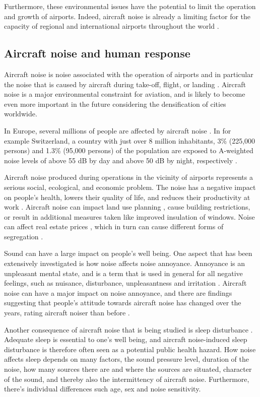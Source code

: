 Furthermore, these environmental issues have the potential to limit the
operation and growth of airports. Indeed, aircraft noise is already a limiting
factor for the capacity of regional and international airports throughout the
world \cite{Zaporozhets2011}.

\subsection{Aircraft noise and human response}
Aircraft noise is noise associated with the operation of airports and in
particular the noise that is caused by aircraft during take-off, flight, or
landing \cite{Zaporozhets2011}. Aircraft noise is a major environmental
constraint for aviation, and is likely to become even more important in the
future considering the densification of cities worldwide.

In Europe, several millions of people are affected by aircraft noise
\cite{MPDGroupLimited2007}. In for example Switzerland, a country with just over
8 million inhabitants, 3\% (225,000 persons) and 1.3\% (95,000 persons) of the
population are exposed to A-weighted noise levels of above 55 dB by day and above
50 dB by night, respectively \cite{Kirk2009,Schaffer2014}.

Aircraft noise produced during operations in the vicinity of airports represents
a serious social, ecological, and economic problem. The noise has a negative
impact on people's health, lowers their quality of life, and reduces their
productivity at work \cite{Zaporozhets2011}. Aircraft noise can impact land use
planning \cite{Freestone2010}, cause building restrictions, or result
in additional measures taken like improved insulation of windows. Noise can
affect real estate prices \cite{Theebe2004}, which in turn can cause different
forms of segregation \cite{Bjornskau2005}.

Sound can have a large impact on people's well being. One aspect that has been
extensively investigated is how noise affects noise annoyance. Annoyance is an
unpleasant mental state, and is a term that is used in general for all negative
feelings, such as nuisance, disturbance, unpleasantness and irritation
\cite{Guski1999}. Aircraft noise can have a major impact on noise annoyance,
and there are findings suggesting that people's attitude towards aircraft noise
has changed over the years, rating aircraft noiser than before \cite{Babisch2009}.

Another consequence of aircraft noise that is being studied is sleep disturbance
\cite{Michaud2007}. Adequate sleep is essential to one's well being, and
aircraft noise-induced sleep disturbance is therefore often seen as a potential
public health hazard.
How noise affects sleep depends on many factors, the sound pressure level,
duration of the noise, how many sources there are and where the sources are situated,
character of the sound, and thereby also the intermittency of aircraft noise.
Furthermore, there's individual differences such age, sex and noise sensitivity.


